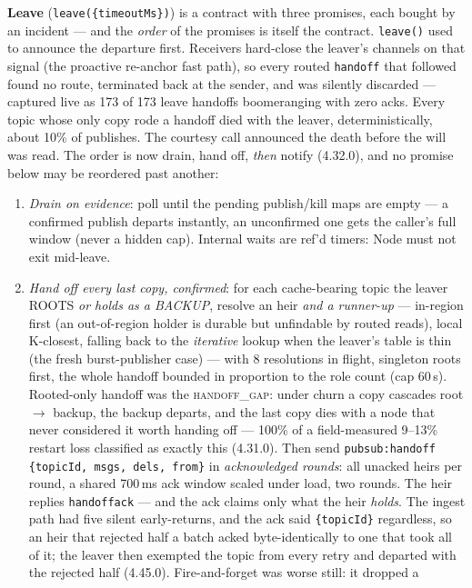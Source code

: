 \documentclass[nobib]{tufte-handout}
\begin{document}
\textbf{Leave} (\texttt{leave(\{timeoutMs\})}) is a contract with three
promises, each bought by an incident --- and the \emph{order} of the
promises is itself the contract. \texttt{leave()} used to announce the
departure first. Receivers hard-close the leaver's channels on that
signal (the proactive re-anchor fast path), so every routed
\texttt{handoff} that followed found no route, terminated back at the
sender, and was silently discarded --- captured live as 173 of 173
leave handoffs boomeranging with zero acks. Every topic whose only copy
rode a handoff died with the leaver, deterministically, about 10\% of
publishes. The courtesy call announced the death before the will was
read. The order is now drain, hand off, \emph{then} notify (4.32.0),
and no promise below may be reordered past another:
\begin{enumerate}
\item \emph{Drain on evidence}: poll until the pending publish/kill maps
  are empty --- a confirmed publish departs instantly, an unconfirmed one
  gets the caller's full window (never a hidden cap). Internal waits are
  ref'd timers: Node must not exit mid-leave.
\item \emph{Hand off every last copy, confirmed}: for each cache-bearing
  topic the leaver ROOTS \emph{or holds as a BACKUP}, resolve an heir
  \emph{and a runner-up} --- in-region first (an out-of-region holder is
  durable but unfindable by routed reads), local K-closest, falling
  back to the \emph{iterative} lookup when the leaver's table is thin
  (the fresh burst-publisher case) --- with 8 resolutions in flight,
  singleton roots first, the whole handoff bounded in proportion to the
  role count (cap 60\,s). Rooted-only handoff was the
  \textsc{handoff\_gap}: under churn a copy cascades root
  $\to$ backup, the backup departs, and the last copy dies with a node
  that never considered it worth handing off --- 100\% of a
  field-measured 9--13\% restart loss classified as exactly this
  (4.31.0). Then send \texttt{pubsub:handoff \{topicId, msgs, dels,
  from\}} in \emph{acknowledged rounds}: all unacked heirs per round, a
  shared 700\,ms ack window scaled under load, two rounds. The heir
  replies \texttt{handoffack} --- and the ack claims only what the heir
  \emph{holds}. The ingest path had five silent early-returns, and the
  ack said \texttt{\{topicId\}} regardless, so an heir that rejected
  half a batch acked byte-identically to one that took all of it; the
  leaver then exempted the topic from every retry and departed with the
  rejected half (4.45.0). Fire-and-forget was worse still: it dropped a

\end{enumerate}
\end{document}
